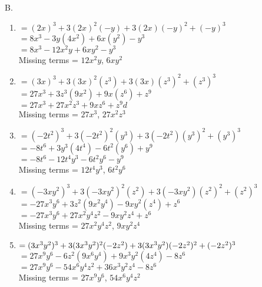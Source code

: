 B. %
\begin{enumerate}[label = \arabic*. ]
\item \hspce %
$=(2x)^{3} + 3(2x)^{2}(- y) + 3(2x)(- y)^{2} + (- y)^{3}$\\
$=8x^{3} - 3y(4x^{2}) + 6x(y^{2}) - y^{3}$\\
$= 8 x^{3} - 12 x^{2} y + 6 x y^{2} - y^{3}$\\
Missing terms = $12 x^{2} y$, $6 x y^{2}$

\item \hspce %
$=(3x)^{3} + 3(3x)^{2}(z^3) + 3(3x)(z^3)^{2} + (z^3)^{3}$\\
$=27x^{3} + 3z^3(9x^{2}) + 9x(z^6) + z^9$\\
$= 27 x^{3} + 27 x^{2} z^{3} + 9 x z^{6} + z^{9}d$\\
Missing terms = $27 x^{3} $, $27 x^{2} z^{3}$

\item \hspce %
$=(-2t^2)^{3} + 3(-2t^2)^{2}(y^3) + 3(-2t^2)(y^3)^{2} + (y^3)^{3}$\\
$=-8t^6 + 3y^3(4t^4)  - 6t^2(y^6) + y^9$\\
$= - 8 t^{6} - 12 t^{4} y^{3} - 6 t^{2} y^{6} - y^{9}$\\
Missing terms = $12 t^{4} y^{3}$, $6 t^{2} y^{6}$

\item \hspce %
$=(-3xy^2)^{3} + 3(-3xy^2)^{2}(z^2) + 3(-3xy^2)(z^2)^{2} + (z^2)^{3}$\\
$=-27x^3y^6 + 3z^2(9x^2y^4)  -9xy^2(z^4) + z^6$\\
$= - 27 x^{3} y^{6} + 27 x^{2} y^{4} z^{2} - 9 x y^{2} z^{4} + z^{6}$\\
Missing terms = $27 x^{2} y^{4} z^{2}$, $9 x y^{2} z^{4}$

\item \hspce %
$=(3x^3y^2)^{3} + 3(3x^3y^2)^{2}(-2z^2) + 3(3x^3y^2)(-2z^2)^{2} \\+ (-2z^2)^{3}$\\
$=27x^9y^6 - 6z^2(9x^6y^4) + 9x^3y^2(4z^4) - 8z^6$\\
$=27 x^{9} y^{6} - 54 x^{6} y^{4} z^{2} + 36 x^{3} y^{2} z^{4} - 8 z^{6}$\\
Missing terms = $27 x^{9} y^{6}$, $54 x^{6} y^{4} z^{2}$\\
\end{enumerate}  